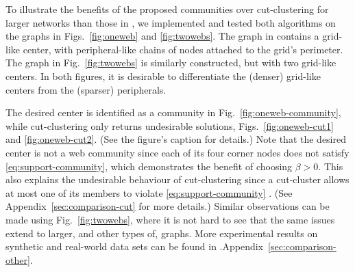 

To illustrate the benefits of the proposed communities over cut-clustering for larger networks than
those in , we implemented and tested both algorithms on the graphs in
Figs.~\ref{fig:oneweb} and \ref{fig:twowebs}. The graph in  contains a grid-like center,
with peripheral-like chains of nodes attached to the grid's perimeter.
The graph in Fig.~\ref{fig:twowebs} is similarly constructed, but with two grid-like centers.
In both figures, it is desirable to differentiate the (denser) grid-like centers from the (sparser)
peripherals.


The desired center is identified as a community in Fig.~\ref{fig:oneweb-community}, while
cut-clustering only returns undesirable solutions, Figs.~\ref{fig:oneweb-cut1} and
\ref{fig:oneweb-cut2}. (See the figure's caption for details.) 
Note that the desired center is not a web community since each of its four corner nodes does not
satisfy \eqref{eq:support-community}, which demonstrates the benefit of choosing $\beta > 0$.
This also explains the undesirable behaviour of cut-clustering since a cut-cluster allows at most
one of its members to violate \eqref{eq:support-community} \cite[Lemma~3.1]{flake:cut-clustering}.
(See \ifPAGELIMIT\cite[Appendix~A]{long} \else Appendix~\ref{sec:comparison-cut} \fi for more details.)
Similar observations can be made using Fig.~\ref{fig:twowebs}, where it is not hard to see that the
same issues extend to larger, and other types of, graphs.  More experimental results on synthetic
and real-world data sets can be found in
\ifPAGELIMIT\cite[Appendix~B]{long}.\else Appendix~\ref{sec:comparison-other}.\fi



